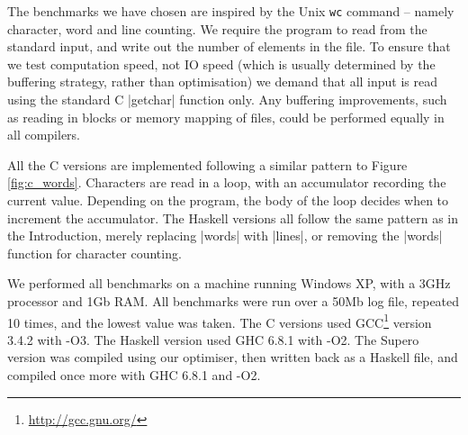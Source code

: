 The benchmarks we have chosen are inspired by the Unix \texttt{wc} command -- namely character, word and line counting. We require the program to read from the standard input, and write out the number of elements in the file. To ensure that we test computation speed, not IO speed (which is usually determined by the buffering strategy, rather than optimisation) we demand that all input is read using the standard C |getchar| function only. Any buffering improvements, such as reading in blocks or memory mapping of files, could be performed equally in all compilers.

All the C versions are implemented following a similar pattern to Figure \ref{fig:c_words}. Characters are read in a loop, with an accumulator recording the current value. Depending on the program, the body of the loop decides when to increment the accumulator. The Haskell versions all follow the same pattern as in the Introduction, merely replacing |words| with |lines|, or removing the |words| function for character counting.

We performed all benchmarks on a machine running Windows XP, with a 3GHz processor and 1Gb RAM. All benchmarks were run over a 50Mb log file, repeated 10 times, and the lowest value was taken. The C versions used GCC\footnote{\url{http://gcc.gnu.org/}} version 3.4.2 with -O3. The Haskell version used GHC 6.8.1 with -O2. The Supero version was compiled using our optimiser, then written back as a Haskell file, and compiled once more with GHC 6.8.1 and -O2.

